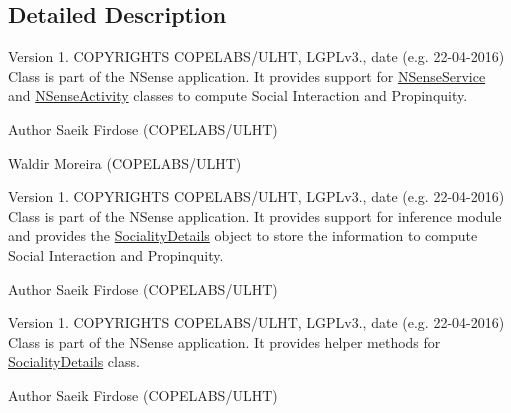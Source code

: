 \subsection{Detailed Description}
\begin{DoxyVersion}{Version}
1. C\-O\-P\-Y\-R\-I\-G\-H\-T\-S C\-O\-P\-E\-L\-A\-B\-S/\-U\-L\-H\-T, L\-G\-P\-Lv3., date (e.\-g. 22-\/04-\/2016) Class is part of the N\-Sense application. It provides support for \hyperlink{classcs_1_1nsense_1_1_n_sense_service}{N\-Sense\-Service} and \hyperlink{classcs_1_1nsense_1_1_n_sense_activity}{N\-Sense\-Activity} classes to compute Social Interaction and Propinquity. 
\end{DoxyVersion}
\begin{DoxyAuthor}{Author}
Saeik Firdose (C\-O\-P\-E\-L\-A\-B\-S/\-U\-L\-H\-T) 



Waldir Moreira (C\-O\-P\-E\-L\-A\-B\-S/\-U\-L\-H\-T)
\end{DoxyAuthor}
\begin{DoxyVersion}{Version}
1. C\-O\-P\-Y\-R\-I\-G\-H\-T\-S C\-O\-P\-E\-L\-A\-B\-S/\-U\-L\-H\-T, L\-G\-P\-Lv3., date (e.\-g. 22-\/04-\/2016) Class is part of the N\-Sense application. It provides support for inference module and provides the \hyperlink{classcs_1_1nsense_1_1inference_module_1_1_sociality_details}{Sociality\-Details} object to store the information to compute Social Interaction and Propinquity. 
\end{DoxyVersion}
\begin{DoxyAuthor}{Author}
Saeik Firdose (C\-O\-P\-E\-L\-A\-B\-S/\-U\-L\-H\-T)
\end{DoxyAuthor}
\begin{DoxyVersion}{Version}
1. C\-O\-P\-Y\-R\-I\-G\-H\-T\-S C\-O\-P\-E\-L\-A\-B\-S/\-U\-L\-H\-T, L\-G\-P\-Lv3., date (e.\-g. 22-\/04-\/2016) Class is part of the N\-Sense application. It provides helper methods for \hyperlink{classcs_1_1nsense_1_1inference_module_1_1_sociality_details}{Sociality\-Details} class. 
\end{DoxyVersion}
\begin{DoxyAuthor}{Author}
Saeik Firdose (C\-O\-P\-E\-L\-A\-B\-S/\-U\-L\-H\-T) 
\end{DoxyAuthor}
